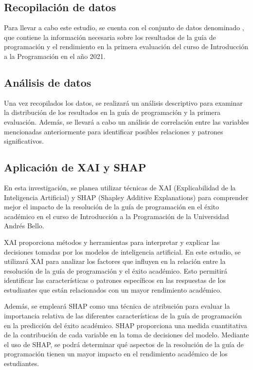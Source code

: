 \subsection{Recopilación de datos}

Para llevar a cabo este estudio, se cuenta con el conjunto de datos denominado , que contiene la información necesaria sobre los
resultados de la guía de programación y el rendimiento en la primera evaluación del curso de Introducción a la Programación en el año 2021.


\subsection{Análisis de datos}

Una vez recopilados los datos, se realizará un análisis descriptivo para examinar la distribución de los resultados en la guía de programación y la primera evaluación. Además, se llevará a cabo un análisis de correlación entre las variables mencionadas anteriormente para identificar posibles
relaciones y patrones significativos.

\subsection{Aplicación de XAI y SHAP}

En esta investigación, se planea utilizar técnicas de XAI (Explicabilidad de la Inteligencia Artificial) y SHAP (Shapley Additive Explanations) para comprender mejor el impacto de la resolución de la guía de programación en el éxito académico en el curso de Introducción a la Programación de la Universidad Andrés Bello.

XAI proporciona métodos y herramientas para interpretar y explicar las decisiones tomadas por los modelos de inteligencia artificial. En este estudio, se utilizará XAI para analizar los factores que influyen en la relación entre la resolución de la guía de programación y el éxito académico. Esto permitirá identificar las características o patrones específicos en las respuestas de los estudiantes que están relacionados con un mayor rendimiento académico.

Además, se empleará SHAP como una técnica de atribución para evaluar la importancia relativa de las diferentes características de la guía de programación en la predicción del éxito académico. SHAP proporciona una medida cuantitativa de la contribución de cada variable en la toma de decisiones del modelo. Mediante el uso de SHAP, se podrá determinar qué aspectos de la resolución de la guía de programación tienen un mayor impacto en el rendimiento académico de los estudiantes.

